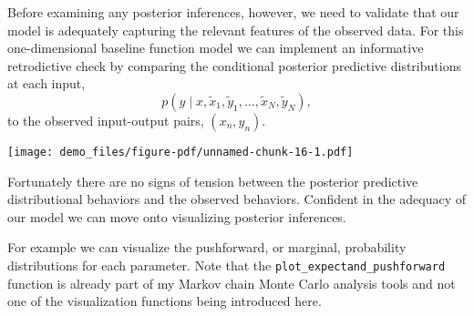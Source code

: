 \documentclass[
  letterpaper,
  DIV=11,
  numbers=noendperiod]{scrartcl}
\newenvironment{Shaded}{\begin{snugshade}}{\end{snugshade}}
\newcommand{\AttributeTok}[1]{\textcolor[rgb]{0.40,0.45,0.13}{#1}}
\newcommand{\ControlFlowTok}[1]{\textcolor[rgb]{0.00,0.23,0.31}{#1}}
\newcommand{\DecValTok}[1]{\textcolor[rgb]{0.68,0.00,0.00}{#1}}
\newcommand{\FloatTok}[1]{\textcolor[rgb]{0.68,0.00,0.00}{#1}}
\newcommand{\FunctionTok}[1]{\textcolor[rgb]{0.28,0.35,0.67}{#1}}
\newcommand{\NormalTok}[1]{\textcolor[rgb]{0.00,0.23,0.31}{#1}}
\newcommand{\OtherTok}[1]{\textcolor[rgb]{0.00,0.23,0.31}{#1}}
\newcommand{\SpecialCharTok}[1]{\textcolor[rgb]{0.37,0.37,0.37}{#1}}
\newcommand{\StringTok}[1]{\textcolor[rgb]{0.13,0.47,0.30}{#1}}
\begin{document}
Before examining any posterior inferences, however, we need to validate
that our model is adequately capturing the relevant features of the
observed data. For this one-dimensional baseline function model we can
implement an informative retrodictive check by comparing the conditional
posterior predictive distributions at each input, \[
p(y \mid x,
         \tilde{x}_{1}, \tilde{y}_{1}, \ldots, \tilde{x}_{N}, \tilde{y}_{N}),
\] to the observed input-output pairs, \((x_{n}, y_{n})\).

\begin{Shaded}
\end{Shaded}

\texttt{[image: demo\_files/figure-pdf/unnamed-chunk-16-1.pdf]}

Fortunately there are no signs of tension between the posterior
predictive distributional behaviors and the observed behaviors.
Confident in the adequacy of our model we can move onto visualizing
posterior inferences.

For example we can visualize the pushforward, or marginal, probability
distributions for each parameter. Note that the
\texttt{plot\_expectand\_pushforward} function is already part of my
Markov chain Monte Carlo analysis tools and not one of the visualization
functions being introduced here.
\end{document}
